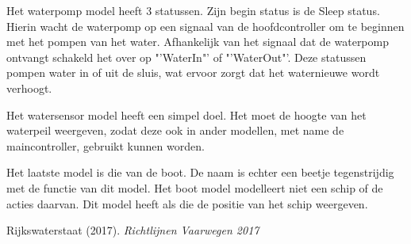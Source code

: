 \documentclass{article}
\begin{document}
Het waterpomp model heeft 3 statussen. Zijn begin status is de Sleep status. Hierin wacht de waterpomp op een signaal van de hoofdcontroller om te beginnen met het pompen van het water. Afhankelijk van het signaal dat de waterpomp ontvangt schakeld het over op "'WaterIn"' of "'WaterOut"'. Deze statussen pompen water in of uit de sluis, wat ervoor zorgt dat het waternieuwe wordt verhoogt.

Het watersensor model heeft een simpel doel. Het moet de hoogte van het waterpeil weergeven, zodat deze ook in ander modellen, met name de maincontroller, gebruikt kunnen worden.

Het laatste model is die van de boot. De naam is echter een beetje tegenstrijdig met de functie van dit model. Het boot model modelleert niet een schip of de acties daarvan. Dit model heeft als die de positie van het schip weergeven.



\clearpage %

\clearpage %
\begin{thebibliography}{9}
Rijkswaterstaat (2017).
\textit{Richtlijnen Vaarwegen 2017}\\

\end{thebibliography}
\end{document}
